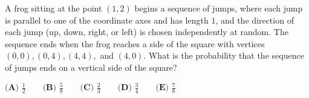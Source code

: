 A frog sitting at the point $(1, 2)$ begins a sequence of jumps, where each jump is parallel to one of the coordinate axes and has length $1$, and the direction of each jump (up, down, right, or left) is chosen independently at random. The sequence ends when the frog reaches a side of the square with vertices $(0,0), (0,4), (4,4),$ and $(4,0)$. What is the probability that the sequence of jumps ends on a vertical side of the square$?$

$\textbf{(A) } \frac{1}{2} \qquad \textbf{(B) } \frac{5}{8} \qquad \textbf{(C) } \frac{2}{3} \qquad \textbf{(D) } \frac{3}{4} \qquad \textbf{(E) } \frac{7}{8}$